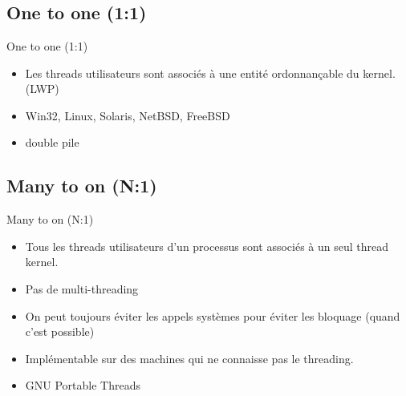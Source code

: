 \section{\sectitle}
\begin{frame}{\sectitle}
    \def\subsectitle{One to one (1:1)}
    \subsection{\subsectitle}
    \begin{block}{\subsectitle}
        \begin{itemize}
            \item Les threads utilisateurs sont associés à une entité
                ordonnançable du kernel. (LWP)
            \item Win32, Linux, Solaris, NetBSD, FreeBSD
            \item double pile
        \end{itemize}
    \end{block}
    \def\subsectitle{Many to on (N:1)}
    \subsection{\subsectitle}
    \begin{block}{\subsectitle}
        \begin{itemize}
            \item Tous les threads utilisateurs d'un processus sont associés à
                un seul thread kernel.
            \item Pas de multi-threading
            \item On peut toujours éviter les appels systèmes pour éviter les
                bloquage (quand c'est possible)
            \item Implémentable sur des machines qui ne connaisse pas le
                threading.
            \item GNU Portable Threads
        \end{itemize}
    \end{block}
\end{frame}


\def\sectitle{}
